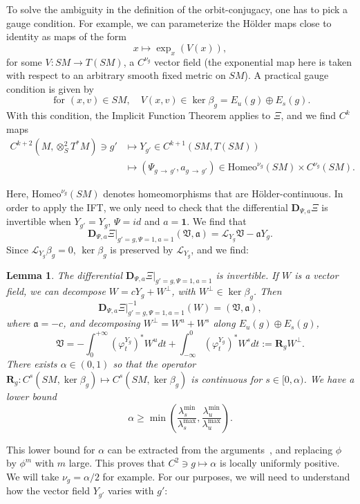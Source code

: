 \documentclass[10pt]{amsart}
\newtheorem{lemm}[theo]{Lemma}\newtheorem{prop}[theo]{Proposition}\newtheorem{coro}[theo]{Corollary}\newtheorem{conj}[theo]{Conjecture}
\theoremstyle{definition}\newtheorem{defi}[theo]{Definition}\newtheorem{rema}[theo]{Remark}\newtheorem{exam}[theo]{Example}\newtheorem{exem}[theo]{Example}\newtheorem{nota}[theo]{Notation}
\newcommand{\RR}{\mathbf{R}}
\newcommand{\bdD}{\mathbf{D}}
\newcommand{\bfun}{\mathbf{1}}
\newcommand{\ClL}{\mathcal{L}}
\newcommand{\fkV}{\mathfrak{V}}
\newcommand{\fka}{\mathfrak{a}}
\newcommand{\Homeo}{\mathrm{Homeo}}
\begin{document}
To solve the ambiguity in the definition of the orbit-conjugacy, one has to pick a gauge condition. For example, we can parameterize the H\"older maps close to identity as maps of the form
\[
x \mapsto \exp_x (V(x)),
\]
for some $V:SM \to T(SM)$, a $C^{\nu_g}$ vector field (the exponential map here is taken with respect to an arbitrary smooth fixed metric on $SM$). A practical gauge condition is given by
\[
\text{ for } (x,v) \in SM,\quad V(x,v) \in \ker \beta_g = E_u(g) \oplus E_s(g).
\]
With this condition, the Implicit Function Theorem applies to $\Xi$, and we find $C^k$ maps
\begin{align*}
C^{k+2}\left(M,\otimes^2_S T^*M\right) \owns g' &\mapsto Y_{g'} \in C^{k+1}(SM,T(SM)) \\
&\mapsto \left(\Psi_{g\,\to\,g'}, a_{g\,\to\,g'}\right) \in \Homeo^{\nu_g}(SM) \times C^{\nu_g}(SM).
\end{align*}

Here, $\Homeo^{\nu_g}(SM)$ denotes homeomorphisms that are H\"older-continuous. In order to apply the IFT, we only need to check that the differential $\bdD_{\Psi,a}\Xi$ is invertible when $Y_{g'}=Y_g$, $\Psi=id$ and $a=\bfun$. We find that
\[
\bdD_{\Psi,a}\Xi|_{g'=g,\Psi=1,a=1} (\fkV,\fka) = \ClL_{Y_g} \fkV - \fka Y_g.
\]
Since $\ClL_{Y_g} \beta_g = 0$, $\ker \beta_g$ is preserved by $\ClL_{Y_g}$, and we find:



\begin{lemm}\label{lemma:dllm}
The differential $\bdD_{\Psi,a}\Xi|_{g'=g,\Psi=1,a=1}$ is invertible. If $W$ is a vector field, we can decompose $W = c Y_g + W^{\perp}$, with $W^\perp \in \ker \beta_g$. Then
\[
\bdD_{\Psi,a}\Xi|_{g'=g,\Psi=1,a=1}^{-1}(W) = (\fkV,\fka),
\]
where $\fka= - c$, and decomposing $W^\perp = W^u + W^s$ along $E_u(g)\oplus E_s(g)$,
\[
\fkV = - \int_0^{+\infty} \left(\varphi^{Y_g}_t\right)^\ast W^u dt + \int_{-\infty}^0 \left(\varphi^{Y_g}_t\right)^\ast W^s dt := \RR_g W^{\perp}.
\]
There exists $\alpha\in(0,1)$ so that the operator $\RR_g : C^s(SM,\ker \beta_g) \mapsto C^s(SM,\ker \beta_g)$ is continuous for $s\in [0,\alpha)$. We have a lower bound
\[
\alpha \geq \min\left(\frac{\lambda_s^{\min}}{\lambda_s^{\max}}, \frac{\lambda_u^{\min}}{\lambda_u^{\max}} \right).
\]
\end{lemm}

This lower bound for $\alpha$ can be extracted from the arguments~\cite[p.~593] {Katok-Knieper-Pollicott-Weiss-89}, and replacing $\phi$ by $\phi^m$ with $m$ large. This proves that $C^2\ni g \mapsto \alpha$ is locally uniformly positive. We will take $\nu_g = \alpha/2$ for example. For our purposes, we will need to understand how the vector field $Y_{g'}$ varies with $g'$:
\end{document}
